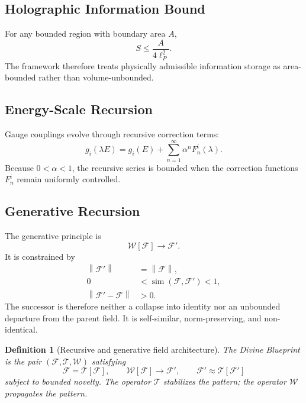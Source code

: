 \documentclass[12pt]{article}
\newtheorem{definition}[theorem]{Definition}
\theoremstyle{remark}
\newcommand{\F}{\mathcal{F}}
\newcommand{\T}{\mathcal{T}}
\newcommand{\W}{\mathcal{W}}
\newcommand{\norm}[1]{\left\lVert #1 \right\rVert}
\begin{document}
\subsection{Holographic Information Bound}

For any bounded region with boundary area $A$,
\begin{equation}
  S \leq \frac{A}{4\ell_P^2}.
  \label{eq:holographic}
\end{equation}
The framework therefore treats physically admissible information storage as
area-bounded rather than volume-unbounded.

\subsection{Energy-Scale Recursion}

Gauge couplings evolve through recursive correction terms:
\begin{equation}
  g_i(\lambda E)=g_i(E)+\sum_{n=1}^{\infty}\alpha^n F_n^i(\lambda).
  \label{eq:coupling-recursion}
\end{equation}
Because $0<\alpha<1$, the recursive series is bounded when the correction
functions $F_n^i$ remain uniformly controlled.

\subsection{Generative Recursion}

The generative principle is
\begin{equation}
  \W[\F]\longrightarrow \F'.
  \label{eq:generative}
\end{equation}
It is constrained by
\begin{align}
  \norm{\F'} &= \norm{\F}, \label{eq:norm-preservation}\\
  0 &< \operatorname{sim}(\F,\F') < 1, \label{eq:similarity}\\
  \norm{\F'-\F} &> 0. \label{eq:residual}
\end{align}
The successor is therefore neither a collapse into identity nor an unbounded
departure from the parent field.  It is self-similar, norm-preserving, and
non-identical.

\begin{definition}[Recursive and generative field architecture]
The Divine Blueprint is the pair $(\F,\T,\W)$ satisfying
\begin{equation}
  \F=\T[\F],
  \qquad
  \W[\F]\to\F',
  \qquad
  \F'\approx\T[\F']
\end{equation}
subject to bounded novelty.  The operator $\T$ stabilizes the pattern; the
operator $\W$ propagates the pattern.
\end{definition}
\end{document}
